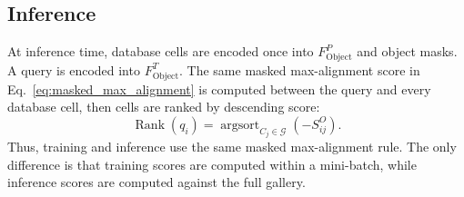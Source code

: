 \documentclass{article}
\begin{document}
\subsection{Inference}

At inference time, database cells are encoded once into $F_{\mathrm{Object}}^{P}$ and object masks. A query is encoded into $F_{\mathrm{Object}}^{T}$. The same masked max-alignment score in Eq.~\eqref{eq:masked_max_alignment} is computed between the query and every database cell, then cells are ranked by descending score:
\begin{equation}
\operatorname{Rank}(q_i)=\operatorname{argsort}_{C_j\in\mathcal{G}}(-S_{ij}^{O}).
\end{equation}
Thus, training and inference use the same masked max-alignment rule. The only difference is that training scores are computed within a mini-batch, while inference scores are computed against the full gallery.
\end{document}

